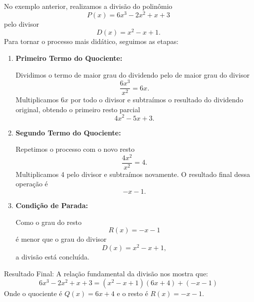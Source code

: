 No exemplo anterior, realizamos a divisão do polinômio
\[
  P(x) = 6x^3 - 2x^2 + x + 3
\]
pelo divisor
\[
  D(x) = x^2 - x + 1.
\]
Para tornar o processo mais didático, seguimos as etapas:
\begin{enumerate}
    \item \textbf{Primeiro Termo do Quociente:}

    Dividimos o termo de maior grau do dividendo pelo de maior grau do divisor
    \[
      \frac{6x^3}{x^2} = 6x.
    \]
    Multiplicamos $6x$ por todo o divisor e subtraímos o resultado do dividendo
    original, obtendo o primeiro resto parcial
    \[
      4x^2 - 5x + 3.
    \]

    \item \textbf{Segundo Termo do Quociente:}

    Repetimos o processo com o novo resto
    \[
      \frac{4x^2}{x^2} = 4.
    \]
    Multiplicamos 4 pelo divisor e subtraímos novamente. O resultado final
    dessa operação é
    \[
      -x - 1.
    \]

    \item \textbf{Condição de Parada:}

    Como o grau do resto
    \[
      R(x) = -x - 1
    \]
    é menor que o grau do divisor
    \[
      D(x) = x^2 - x + 1,
    \]
    a divisão está concluída.

\end{enumerate}
Resultado Final:
A relação fundamental da divisão nos mostra que:
\[
  6x^3 - 2x^2 + x + 3 = (x^2 - x + 1)(6x + 4) + (-x - 1)
\]
Onde o quociente é $Q(x) = 6x + 4$ e o resto é $R(x) = -x - 1$.


